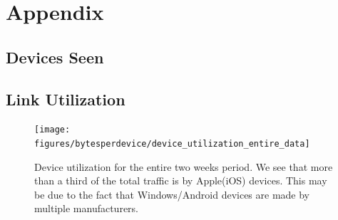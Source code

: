 \section{Appendix}


\subsection{Devices Seen}


\subsection{Link Utilization}

\begin{figure}[t]
  \begin{minipage}{\linewidth}
  \texttt{[image: figures/bytesperdevice/device\_utilization\_entire\_data]}
  \caption{Device utilization for the entire two weeks period. We see that more than a third of the total traffic is by Apple(iOS) devices. This may be due to the fact that Windows/Android devices are made by multiple manufacturers.}
  \label{fig:countofdevices}
  \end{minipage}
\end{figure}

